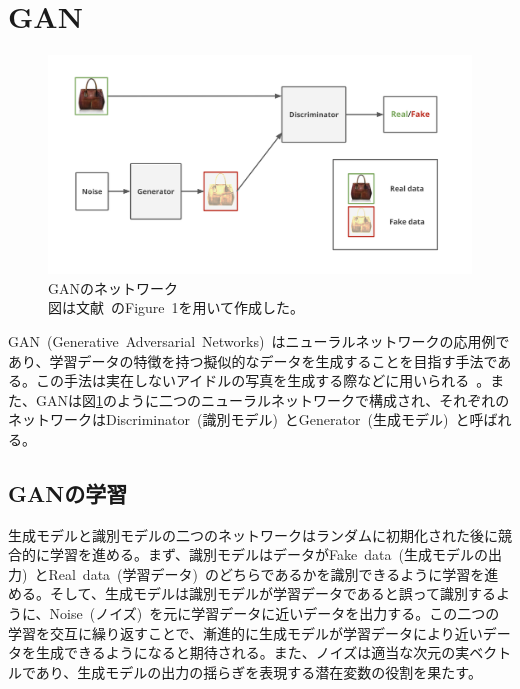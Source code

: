 \section{GAN}

\begin{figure}[b]
\begin{center}
\includegraphics[width=\hsize]{figure/GAN_net.png}
\caption{GANのネットワーク\\
図は文献~\cite{pix2pix}のFigure~1を用いて作成した。}
\label{fig:GAN_net}
\end{center}
\end{figure}

GAN~(Generative~Adversarial~Networks)~\cite{GAN}はニューラルネットワークの応用例であり、学習データの特徴を持つ擬似的なデータを生成することを目指す手法である。この手法は実在しないアイドルの写真を生成する際などに用いられる~\cite{idol}。また、GANは図\ref{fig:GAN_net}のように二つのニューラルネットワークで構成され、それぞれのネットワークはDiscriminator~(識別モデル)~とGenerator~(生成モデル)~と呼ばれる。

\subsection{GANの学習}

生成モデルと識別モデルの二つのネットワークはランダムに初期化された後に競合的に学習を進める。まず、識別モデルはデータがFake~data~(生成モデルの出力)~とReal~data~(学習データ)~のどちらであるかを識別できるように学習を進める。そして、生成モデルは識別モデルが学習データであると誤って識別するように、Noise~(ノイズ)~を元に学習データに近いデータを出力する。この二つの学習を交互に繰り返すことで、漸進的に生成モデルが学習データにより近いデータを生成できるようになると期待される。また、ノイズは適当な次元の実ベクトルであり、生成モデルの出力の揺らぎを表現する潜在変数の役割を果たす。

